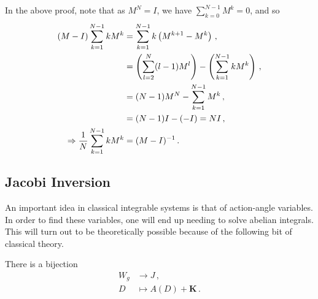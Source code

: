 \documentclass{article}
\begin{document}
\begin{remark}
	In the above proof, note that as $M^N=I$, we have $\sum_{k=0}^{N-1} M^k = 0$, and so 
	\begin{align*}
		(M-I) \sum_{k=1}^{N-1} k M^k &= \sum_{k=1}^{N-1} k \left( M^{k+1}-M^k \right) \, , \\
		&= \left( \sum_{l=2}^{N} (l-1) M^l \right) - \left( \sum_{k=1}^{N-1} k M^k  \right) \, , \\
		&= (N-1)M^N - \sum_{k=1}^{N-1} M^k \, , \\
		&= (N-1)I - (-I) = NI\, , \\
		\Rightarrow \frac{1}{N}\sum_{k=1}^{N-1} k M^k &= (M-I)^{-1} \, . 
	\end{align*} 
\end{remark}

\subsection{Jacobi Inversion}
An important idea in classical integrable systems is that of action-angle variables. In order to find these variables, one will end up needing to solve abelian integrals. This will turn out to be theoretically possible because of the following bit of classical theory. 

\begin{theorem}
	There is a bijection
	\begin{align*}
		W_g &\to J \, , \\
		D &\mapsto A(D)+\bm{K} \, . 
	\end{align*}
\end{theorem}


\end{document}
